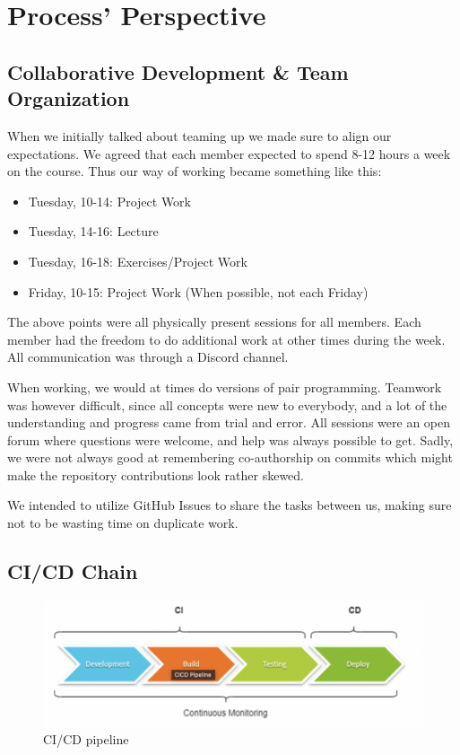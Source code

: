 \section{Process' Perspective}

\subsection{Collaborative Development \& Team Organization}

When we initially talked about teaming up we made sure to align our expectations. We agreed that each member expected to spend 8-12 hours a week on the course. Thus our way of working became something like this:
\begin{itemize}
    \item Tuesday, 10-14: Project Work
    \item Tuesday, 14-16: Lecture
    \item Tuesday, 16-18: Exercises/Project Work
    \item Friday, 10-15: Project Work (When possible, not each Friday)
\end{itemize}

The above points were all physically present sessions for all members. Each member had the freedom to do additional work at other times during the week. All communication was through a Discord channel.

When working, we would at times do versions of pair programming. Teamwork was however difficult, since all concepts were new to everybody, and a lot of the understanding and progress came from trial and error. All sessions were an open forum where questions were welcome, and help was always possible to get. Sadly, we were not always good at remembering co-authorship on commits which might make the repository contributions look rather skewed.

We intended to utilize GitHub Issues to share the tasks between us, making sure not to be wasting time on duplicate work.


\subsection{CI/CD Chain}


\begin{figure}[H]
    \centering
    \includegraphics[width=0.65\linewidth]{Report/Images/CICD.png} 
    \caption{CI/CD pipeline}
    \label{fig:CICD}
\end{figure}


